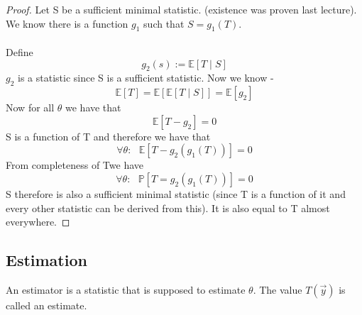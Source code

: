 \documentclass[../main.tex]{subfiles}
\begin{document}
\begin{proof}Let S be a sufficient minimal statistic. (existence was proven last lecture). We know there is a function $g_1$ such that $S=g_1(T)$. \\\\
Define \[g_2(s):=\mathbb{E}[T\mid S]\]
$g_2$ is a statistic since S is a sufficient statistic. Now we know - \[\mathbb{E}[T]=\mathbb{E}[\mathbb{E}[T\mid S]] = \mathbb{E}[g_2]\]
Now for all $\theta$ we have that 
\[\mathbb{E}[T-g_2] = 0\]
S is a function of T and therefore we have that 
\[\forall\theta: \text{ } \mathbb{E}[T-g_2(g_1(T))] = 0\]
From completeness of Twe have 
\[\forall\theta: \text{ } \mathbb{P}[T=g_2(g_1(T))] = 0\]
S therefore is also a sufficient minimal statistic (since T is a function of it and every other statistic can be derived from this). It is also equal to T almost everywhere.\end{proof}
\subsection{Estimation}
\begin{definition} An estimator is a statistic that is supposed to estimate $\theta$. The value $T(\overrightarrow{y})$ is called an estimate. \end{definition}
\end{document}
